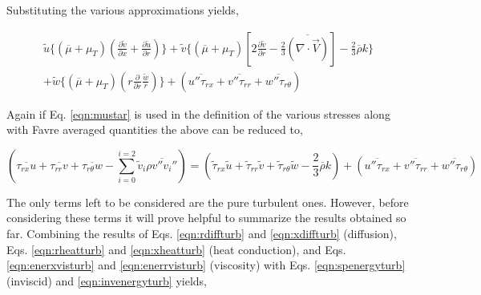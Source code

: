 	Substituting the various approximations yields,

\begin{displaymath}
	\begin{array}{c}
	\tilde u \Big\{(\overline \mu + \mu_T)(\frac{\partial \tilde v}{\partial x} + \frac{\partial \tilde u}
	{\partial r}) \Big\} + \tilde v \Big\{(\overline \mu + \mu_T)[2\frac{\partial \tilde v}{\partial r} -\frac{2}{3}
	\overline{(\nabla \cdot \vec{V})}] -\frac{2}{3}\overline{\rho} k \Big\}
	\\
	+ \tilde w \Big\{(\overline{\mu} + \mu_T)(r\frac{\partial}{\partial r}\frac{\tilde w}{r})
	\Big\} + (\overline{u''\tau_{rx}} + \overline{v''\tau_{rr}} + \overline{w''\tau_{r\theta}})	
	\end{array}
\end{displaymath}

	Again if Eq. \ref{eqn:mustar} is used in the definition of the various stresses along with Favre averaged
quantities the above can be reduced to,

\begin{equation}
	(\overline{\tau_{rx}u} + \overline{\tau_{rr}v} + \overline{\tau_{r\theta}w}
	- \sum_{i=0}^{i=2}\tilde v_i \overline{\rho v'' v_i''}) = (\tilde \tau_{rx} \tilde u + 
	\tilde \tau_{rr} \tilde v + \tilde \tau_{r\theta} \tilde w -\frac{2}{3}\overline{\rho}k)
	 + (\overline{u''\tau_{rx}} + \overline{v''\tau_{rr}} + \overline{w''\tau_{r\theta}})
\label{eqn:enerrvisturb}
\end{equation}

	The only terms left to be considered are the pure turbulent ones.  However, before considering these terms it
will prove helpful to summarize the results obtained so far.  Combining the results of 
Eqs. \ref{eqn:rdiffturb} and \ref{eqn:xdiffturb} (diffusion), Eqs. \ref{eqn:rheatturb} and \ref{eqn:xheatturb}
(heat conduction), and Eqs. \ref{eqn:enerxvisturb} and \ref{eqn:enerrvisturb} (viscosity) with Eqs. \ref{eqn:spenergyturb} (inviscid)
and \ref{eqn:invenergyturb} yields,

